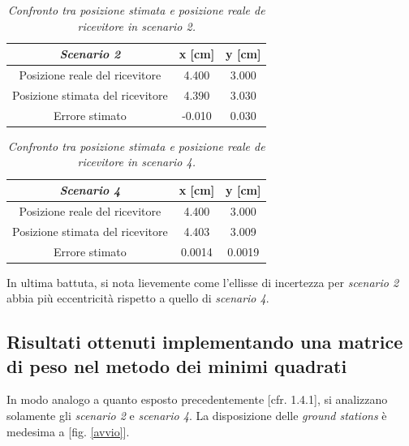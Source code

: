 \documentclass[a4paper,11pt,twoside]{book}
\begin{document}
	 \begin{table}[H]
	 	\begin{center}
	 		\begin{tabular}{|c|c|c|}
	 			\hline
	 			\textsl{Scenario 2} &  x [cm] & y [cm] \\
	 			\hline
	 			Posizione reale del ricevitore & 4.400 & 3.000 \\
	 			\hline
	 			Posizione stimata del ricevitore & 4.390 & 3.030 \\
	 			\hline
	 			Errore stimato & -0.010 & 0.030 \\
	 			\hline
	 		\end{tabular}
	 		\caption{\textit{Confronto tra posizione stimata e posizione reale de ricevitore in \textsl{scenario 2.}}}
	 		\label{tab1}
	 	\end{center}	
	 \end{table}
 
 	 \begin{table}[H]
\begin{center}
	\begin{tabular}{|c|c|c|}
		\hline
		\textsl{Scenario 4} &  x [cm] & y [cm] \\
		\hline
		Posizione reale del ricevitore & 4.400 & 3.000 \\
		\hline
		Posizione stimata del ricevitore & 4.403 & 3.009 \\
		\hline
		Errore stimato & 0.0014 & 0.0019 \\
		\hline
	\end{tabular}
\end{center}
 			\caption{\textit{Confronto tra posizione stimata e posizione reale de ricevitore in \textsl{scenario 4.}}}
 			\label{tab2}

 	\end{table}
	 
	In ultima battuta, si nota lievemente come l'ellisse di incertezza per \textsl{scenario 2} abbia più eccentricità rispetto a quello di \textsl{scenario 4}.
	 
	 \subsection{Risultati ottenuti implementando una matrice di peso nel metodo dei minimi quadrati}
	 
	 In modo analogo a quanto esposto precedentemente [cfr. 1.4.1], si analizzano solamente gli \textsl{scenario 2} e \textsl{scenario 4}. La disposizione delle \textit{ground stations} è medesima a [fig. \ref{avvio}].
	 
\end{document}
